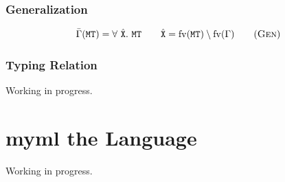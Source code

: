 \documentclass{report}
\newcommand{\theLang}{myml}
\newcommand{\code}{\mathtt}
\newcommand{\ruleTag}[1]{\label{#1}\tag{\textsc{#1}}}
\DeclareMathOperator{\freeVariable}{fv}
\begin{document}
\subsection{Generalization}

\begin{gather}
\bar{\Gamma}(\code{MT}) = \forall\ \hat{\code{X}}.\ \code{MT}
\qquad \hat{\code{X}} = \freeVariable(\code{MT}) \setminus \freeVariable(\Gamma)
\ruleTag{Gen}
\end{gather}

\subsection{Typing Relation}

Working in progress.

\chapter{\theLang{} the Language}

Working in progress.
\end{document}
